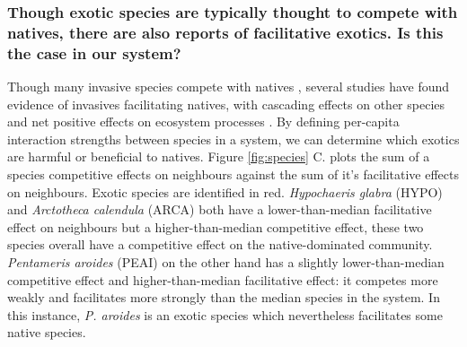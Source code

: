 \documentclass[a4,12pt]{article}
\begin{document}
    \subsubsection*{Though exotic species are typically thought to compete with natives, there are also reports of facilitative exotics. Is this the case in our system?}
    Though many invasive species compete with natives \parencite{Naeem2000, Corbin2004, Riley2008, Zheng2015}, several studies have found evidence of invasives facilitating natives, with cascading effects on other species and net positive effects on ecosystem processes \parencite{Rodriguez2006, Ramus2017}. By defining per-capita interaction strengths between species in a system, we can determine which exotics are harmful or beneficial to natives. Figure \ref{fig:species} C. plots the sum of a species competitive effects on neighbours against the sum of it's facilitative effects on neighbours. Exotic species are identified in red. \textit{Hypochaeris glabra} (HYPO) and \textit{Arctotheca calendula} (ARCA) both have a lower-than-median facilitative effect on neighbours but a higher-than-median competitive effect, these two species overall have a competitive effect on the native-dominated community. \textit{Pentameris aroides} (PEAI) on the other hand has a slightly lower-than-median competitive effect and higher-than-median facilitative effect: it competes more weakly and facilitates more strongly than the median species in the system. In this instance, \textit{P. aroides} is an exotic species which nevertheless facilitates some native species.






\end{document}
